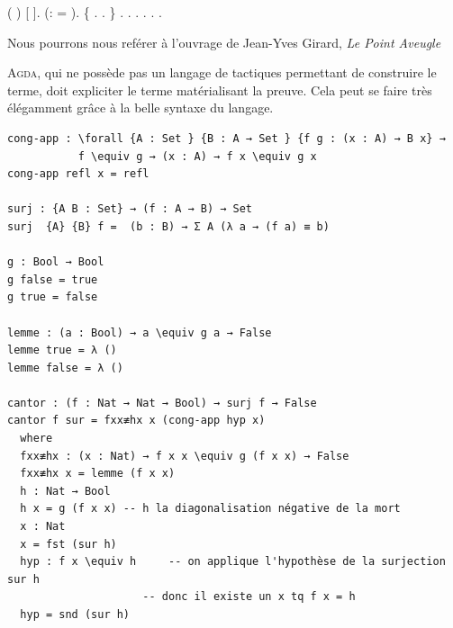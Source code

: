  \begin{coqdoccode}
\coqdocindent{2.00em}
 ( )  [ ].\coqdoceol
\coqdocindent{2.00em}
 (:   =   ).\coqdoceol
\coqdocindent{2.00em}
\{\coqdoceol
\coqdocindent{4.00em}
 . .\coqdoceol
\coqdocindent{2.00em}
\}\coqdoceol
\coqdocindent{2.00em}
   .\coqdoceol
\coqdocindent{2.00em}
   .\coqdoceol
\coqdocindent{2.00em}
   .\coqdoceol
\coqdocindent{2.00em}
.\coqdoceol
\coqdocnoindent
{}.\coqdoceol
\coqdocemptyline
\coqdocnoindent
{} .\coqdoceol
\end{coqdoccode}

Nous pourrons nous reférer à l'ouvrage de Jean-Yves Girard, \textit{Le Point Aveugle}
\cite{girard}

\vspace{.5cm}

\textsc{Agda}, qui ne possède pas un langage de tactiques permettant de construire le terme, 
doit expliciter le terme matérialisant la preuve. Cela peut se faire très élégamment
grâce à la belle syntaxe du langage.\cite[Program = Proof]{PP}
\begin{verbatim}
cong-app : \forall {A : Set } {B : A → Set } {f g : (x : A) → B x} →
           f \equiv g → (x : A) → f x \equiv g x
cong-app refl x = refl

surj : {A B : Set} → (f : A → B) → Set
surj  {A} {B} f =  (b : B) → Σ A (λ a → (f a) ≡ b)

g : Bool → Bool
g false = true
g true = false

lemme : (a : Bool) → a \equiv g a → False
lemme true = λ ()  
lemme false = λ ()  

cantor : (f : Nat → Nat → Bool) → surj f → False
cantor f sur = fxx≢hx x (cong-app hyp x) 
  where 
  fxx≢hx : (x : Nat) → f x x \equiv g (f x x) → False
  fxx≢hx x = lemme (f x x)
  h : Nat → Bool
  h x = g (f x x) -- h la diagonalisation négative de la mort
  x : Nat
  x = fst (sur h)
  hyp : f x \equiv h     -- on applique l'hypothèse de la surjection sur h
                     -- donc il existe un x tq f x = h
  hyp = snd (sur h)
\end{verbatim}

